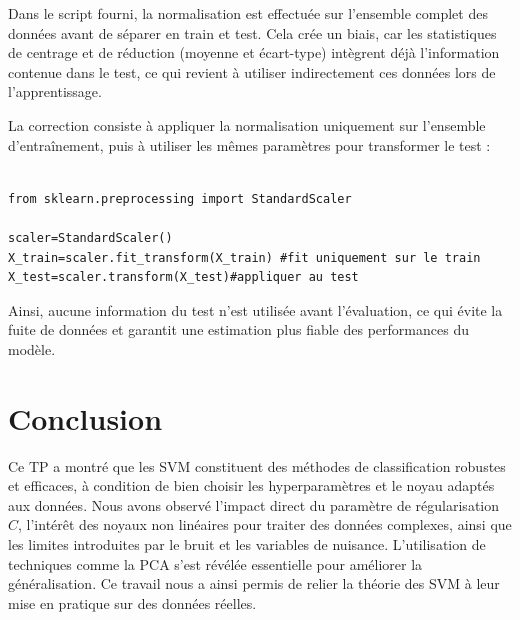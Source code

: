 \documentclass[12pt,a4paper]{report}
\begin{document}
Dans le script fourni, la normalisation est effectuée sur l’ensemble complet des données
avant de séparer en train et test. Cela crée un biais, car les statistiques de centrage
et de réduction (moyenne et écart-type) intègrent déjà l’information contenue dans le test,
ce qui revient à utiliser indirectement ces données lors de l’apprentissage.

La correction consiste à appliquer la normalisation uniquement sur l’ensemble
d’entraînement, puis à utiliser les mêmes paramètres pour transformer le test :

\begin{lstlisting}
    
from sklearn.preprocessing import StandardScaler

scaler=StandardScaler()
X_train=scaler.fit_transform(X_train) #fit uniquement sur le train
X_test=scaler.transform(X_test)#appliquer au test

\end{lstlisting}



Ainsi, aucune information du test n’est utilisée avant l’évaluation, ce qui évite la fuite
de données et garantit une estimation plus fiable des performances du modèle.



\section{Conclusion}


Ce TP a montré que les SVM constituent des méthodes de classification
robustes et efficaces, à condition de bien choisir les hyperparamètres et le
noyau adaptés aux données. Nous avons observé l’impact direct du paramètre
de régularisation \(C\), l’intérêt des noyaux non linéaires pour traiter des
données complexes, ainsi que les limites introduites par le bruit et les variables
de nuisance. L’utilisation de techniques comme la PCA s’est révélée essentielle
pour améliorer la généralisation. Ce travail nous a ainsi permis de relier la
théorie des SVM à leur mise en pratique sur des données réelles.

 
\end{document}
